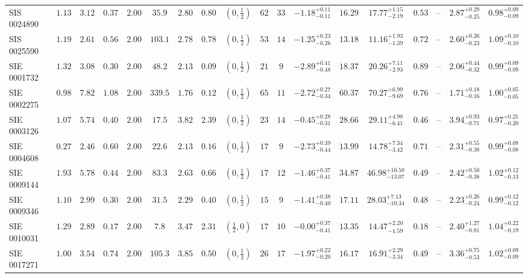 \begin{longtable}{@{}lccccccccccccccccc@{}}
SIS 0024890 & $1.13$ & $3.12$ & $0.37$ & $2.00$ & $35.9$ & $2.80$ & $0.80$ & $(0,\frac12)$ & $62$ & $33$ & $-1.18^{+0.11}_{-0.11}$ & $16.29$ & $17.77^{+1.15}_{-2.19}$ & $0.53$ & -- & $2.87^{+0.29}_{-0.25}$ & $0.98^{+0.09}_{-0.09}$\\
SIS 0025590 & $1.19$ & $2.61$ & $0.56$ & $2.00$ & $103.1$ & $2.78$ & $0.78$ & $(0,\frac12)$ & $53$ & $14$ & $-1.25^{+0.23}_{-0.26}$ & $13.18$ & $11.16^{+1.93}_{-1.39}$ & $0.72$ & -- & $2.60^{+0.26}_{-0.23}$ & $1.09^{+0.10}_{-0.10}$\\
SIE 0001732 & $1.32$ & $3.08$ & $0.30$ & $2.00$ & $48.2$ & $2.13$ & $0.09$ & $(0,\frac12)$ & $21$ & $9$ & $-2.89^{+0.41}_{-0.48}$ & $18.37$ & $20.26^{+7.11}_{-2.93}$ & $0.89$ & -- & $2.06^{+0.44}_{-0.32}$ & $0.99^{+0.09}_{-0.09}$\\
SIE 0002275 & $0.98$ & $7.82$ & $1.08$ & $2.00$ & $339.5$ & $1.76$ & $0.12$ & $(0,\frac12)$ & $65$ & $11$ & $-2.72^{+0.27}_{-0.34}$ & $60.37$ & $70.27^{+6.99}_{-9.69}$ & $0.76$ & -- & $1.71^{+0.18}_{-0.16}$ & $1.00^{+0.05}_{-0.05}$\\
SIE 0003126 & $1.07$ & $5.74$ & $0.40$ & $2.00$ & $17.5$ & $3.82$ & $2.39$ & $(0,\frac12)$ & $23$ & $14$ & $-0.45^{+0.28}_{-0.31}$ & $28.66$ & $29.11^{+4.98}_{-6.41}$ & $0.46$ & -- & $3.94^{+0.93}_{-0.71}$ & $0.97^{+0.21}_{-0.20}$\\
SIE 0004608 & $0.27$ & $2.46$ & $0.60$ & $2.00$ & $22.6$ & $2.13$ & $0.16$ & $(0,\frac12)$ & $17$ & $9$ & $-2.73^{+0.39}_{-0.44}$ & $13.99$ & $14.78^{+7.34}_{-3.42}$ & $0.71$ & -- & $2.31^{+0.55}_{-0.38}$ & $0.99^{+0.08}_{-0.08}$\\
SIE 0009144 & $1.93$ & $5.78$ & $0.44$ & $2.00$ & $83.3$ & $2.63$ & $0.66$ & $(0,\frac12)$ & $17$ & $12$ & $-1.46^{+0.37}_{-0.41}$ & $34.87$ & $46.98^{+10.50}_{-13.07}$ & $0.49$ & -- & $2.42^{+0.50}_{-0.38}$ & $1.02^{+0.12}_{-0.13}$\\
SIE 0009346 & $1.10$ & $2.99$ & $0.30$ & $2.00$ & $31.5$ & $2.29$ & $0.40$ & $(0,\frac12)$ & $15$ & $9$ & $-1.41^{+0.38}_{-0.40}$ & $17.11$ & $28.03^{+7.13}_{-10.34}$ & $0.48$ & -- & $2.23^{+0.26}_{-0.24}$ & $0.99^{+0.12}_{-0.12}$\\
SIE 0010031 & $1.29$ & $2.89$ & $0.17$ & $2.00$ & $7.8$ & $3.47$ & $2.31$ & $(\frac12,0)$ & $17$ & $10$ & $-0.00^{+0.37}_{-0.41}$ & $13.35$ & $14.47^{+2.20}_{-1.59}$ & $0.18$ & -- & $2.40^{+1.27}_{-0.81}$ & $1.04^{+0.22}_{-0.19}$\\
SIE 0017271 & $1.00$ & $3.54$ & $0.74$ & $2.00$ & $105.3$ & $3.85$ & $0.50$ & $(0,\frac12)$ & $26$ & $17$ & $-1.97^{+0.22}_{-0.20}$ & $16.17$ & $16.91^{+2.29}_{-3.34}$ & $0.49$ & -- & $3.36^{+0.75}_{-0.53}$ & $1.02^{+0.09}_{-0.09}$\\

\end{longtable}
